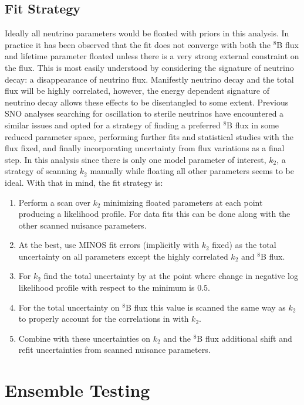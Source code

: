 \subsection{Fit Strategy}
\label{strategy}
Ideally all neutrino parameters would be floated with priors in this analysis. 
In practice it has been observed that the fit does not converge with both the $^8$B flux and lifetime parameter floated unless there is a very strong external constraint on the flux.
This is most easily understood by considering the signature of neutrino decay: a disappearance of neutrino flux.
Manifestly neutrino decay and the total flux will be highly correlated, however, the energy dependent signature of neutrino decay allows these effects to be disentangled to some extent.
Previous SNO analyses searching for oscillation to sterile neutrinos \cite{plthesis} have encountered a similar issues and opted for a strategy of finding a preferred $^8$B flux in some reduced parameter space, performing further fits and statistical studies with the flux fixed, and finally incorporating uncertainty from flux variations as a final step.
In this analysis since there is only one model parameter of interest, $k_2$, a strategy of scanning $k_2$ manually while floating all other parameters seems to be ideal. 
With that in mind, the fit strategy is:
\begin{enumerate}
\item Perform a scan over $k_2$ minimizing floated parameters at each point producing a likelihood profile. For data fits this can be done along with the other scanned nuisance parameters.
\item At the best, use MINOS fit errors (implicitly with $k_2$ fixed) as the total uncertainty on all parameters except the highly correlated $k_2$ and $^8$B flux.
\item For $k_2$ find the total uncertainty by at the point where change in negative log likelihood profile with respect to the minimum is $0.5$.
\item For the total uncertainty on $^8$B flux this value is scanned the same way as $k_2$ to properly account for the correlations in with $k_2$.
\item Combine with these uncertainties on $k_2$ and the $^8$B flux additional shift and refit uncertainties from scanned nuisance parameters.
\end{enumerate}

\section{Ensemble Testing}
\label{ensemble_tests}

